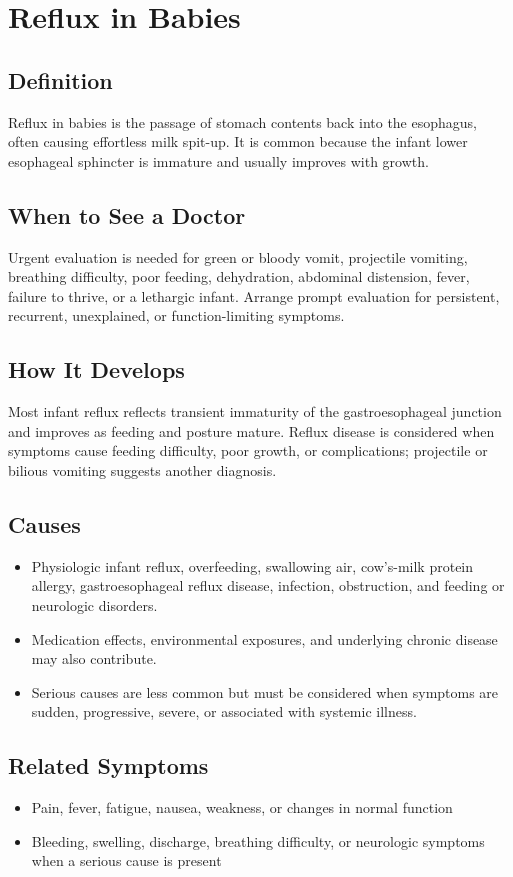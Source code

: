 \chapter{Reflux in Babies}

\section*{Definition}
Reflux in babies is the passage of stomach contents back into the esophagus, often causing effortless milk spit-up. It is common because the infant lower esophageal sphincter is immature and usually improves with growth.

\section*{When to See a Doctor}
Urgent evaluation is needed for green or bloody vomit, projectile vomiting, breathing difficulty, poor feeding, dehydration, abdominal distension, fever, failure to thrive, or a lethargic infant. Arrange prompt evaluation for persistent, recurrent, unexplained, or function-limiting symptoms.

\section*{How It Develops}
Most infant reflux reflects transient immaturity of the gastroesophageal junction and improves as feeding and posture mature. Reflux disease is considered when symptoms cause feeding difficulty, poor growth, or complications; projectile or bilious vomiting suggests another diagnosis.

\section*{Causes}
\begin{itemize}
  \item Physiologic infant reflux, overfeeding, swallowing air, cow’s-milk protein allergy, gastroesophageal reflux disease, infection, obstruction, and feeding or neurologic disorders.
  \item Medication effects, environmental exposures, and underlying chronic disease may also contribute.
  \item Serious causes are less common but must be considered when symptoms are sudden, progressive, severe, or associated with systemic illness.
\end{itemize}

\section*{Related Symptoms}
\begin{itemize}
  \item Pain, fever, fatigue, nausea, weakness, or changes in normal function
  \item Bleeding, swelling, discharge, breathing difficulty, or neurologic symptoms when a serious cause is present
\end{itemize}

